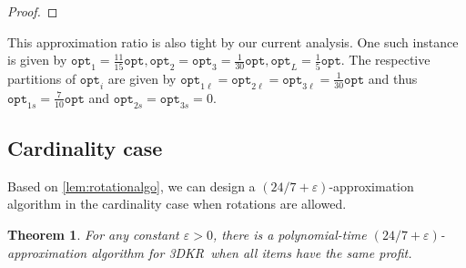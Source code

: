 \documentclass[10pt,a4paper]{amsart}
\newcommand{\mt}[1]{#1}
\newcommand{\eps}{\varepsilon}
\newcommand{\tdkr}{\textsc{3DKR}}
\newtheorem{theorem}{Theorem}[section]
\theoremstyle{definition}
\newcommand{\opt}{\mathtt{opt}}
\begin{document}
\begin{proof}
\end{proof}
\mt{This approximation ratio is also tight by our current analysis. One such instance is given by $\opt_1=\frac{11}{15}\opt, \opt_2=\opt_3=\frac{1}{30}\opt, \opt_L=\frac{1}{5}\opt$. The respective partitions of $\opt_i$ are given by $\opt_{1\ell}=\opt_{2\ell}=\opt_{3\ell}=\frac{1}{30}\opt$ and thus $\opt_{1s}=\frac{7}{10}\opt$ and $\opt_{2s}=\opt_{3s}=0$.}








\subsection{Cardinality case}
\label{sec:tdkrc}
Based on \cref{lem:rotationalgo}, we can design a $(24/7+\eps)$-approximation algorithm in the cardinality case when rotations are allowed.

\begin{theorem}
    \label{thm:r3dkce}
   For any constant $\eps>0$, there is a polynomial-time $(24/7 +\eps)$-approximation algorithm for \tdkr~when all items have the same profit.  
\end{theorem}
\end{document}
